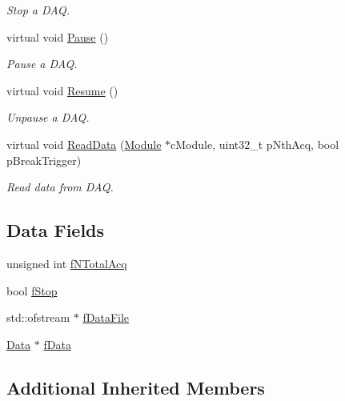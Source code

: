 \begin{DoxyCompactItemize}
\begin{DoxyCompactList}\small\item\em Stop a D\-A\-Q. \end{DoxyCompactList}\item 
virtual void \hyperlink{class_ph2___hw_interface_1_1_be_board_f_w_interface_afb21d1663b328272c12cab6970114ecd}{Pause} ()
\begin{DoxyCompactList}\small\item\em Pause a D\-A\-Q. \end{DoxyCompactList}\item 
virtual void \hyperlink{class_ph2___hw_interface_1_1_be_board_f_w_interface_aafa48fcae2c37040141afc89113881e5}{Resume} ()
\begin{DoxyCompactList}\small\item\em Unpause a D\-A\-Q. \end{DoxyCompactList}\item 
virtual void \hyperlink{class_ph2___hw_interface_1_1_be_board_f_w_interface_a75c534cace8f5984c588824cae6d2371}{Read\-Data} (\hyperlink{class_ph2___hw_description_1_1_module}{Module} $\ast$c\-Module, uint32\-\_\-t p\-Nth\-Acq, bool p\-Break\-Trigger)
\begin{DoxyCompactList}\small\item\em Read data from D\-A\-Q. \end{DoxyCompactList}\end{DoxyCompactItemize}
\subsection*{Data Fields}
\begin{DoxyCompactItemize}
\item 
unsigned int \hyperlink{class_ph2___hw_interface_1_1_be_board_f_w_interface_a9cc80365ec331732245553a8bc0024ab}{f\-N\-Total\-Acq}
\item 
bool \hyperlink{class_ph2___hw_interface_1_1_be_board_f_w_interface_a2eae0dd93411d8acec67a41bcc09339b}{f\-Stop}
\item 
std\-::ofstream $\ast$ \hyperlink{class_ph2___hw_interface_1_1_be_board_f_w_interface_afa2f1748f8a2d527961766449cd91386}{f\-Data\-File}
\item 
\hyperlink{class_ph2___hw_interface_1_1_data}{Data} $\ast$ \hyperlink{class_ph2___hw_interface_1_1_be_board_f_w_interface_a9b315d4b61df34d093ed35cfef755a0f}{f\-Data}
\end{DoxyCompactItemize}
\subsection*{Additional Inherited Members}


